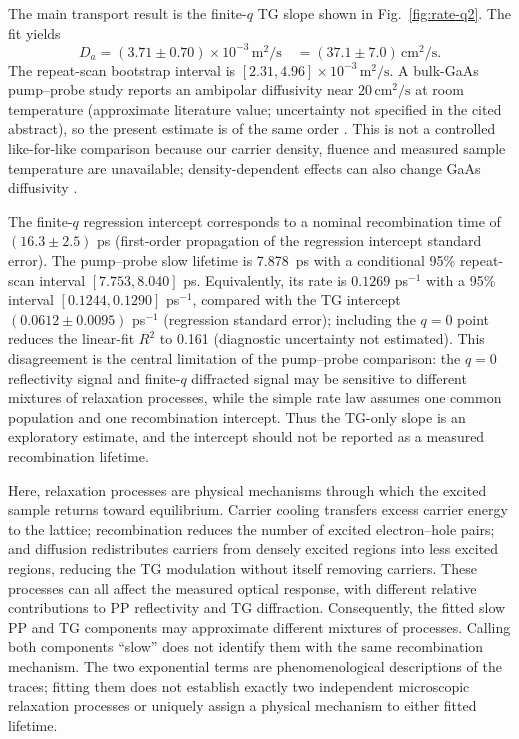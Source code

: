 \documentclass[11pt,a4paper]{article}
\begin{document}
The main transport result is the finite-$q$ TG slope shown in Fig.~\ref{fig:rate-q2}. The fit yields
\begin{equation*}
D_a=(3.71\pm0.70)\times10^{-3}\,\si{\metre\squared\per\second}
\quad = (37.1\pm7.0)\,\si{\centi\metre\squared\per\second}.
\end{equation*}
The repeat-scan bootstrap interval is $[2.31,4.96]\times10^{-3}\,\si{\metre\squared\per\second}$. A bulk-GaAs pump--probe study reports an ambipolar diffusivity near $20\,\si{\centi\metre\squared\per\second}$ at room temperature (approximate literature value; uncertainty not specified in the cited abstract), so the present estimate is of the same order \cite{ruzicka}. This is not a controlled like-for-like comparison because our carrier density, fluence and measured sample temperature are unavailable; density-dependent effects can also change GaAs diffusivity \cite{young}.

The finite-$q$ regression intercept corresponds to a nominal recombination time of $(16.3\pm2.5)$ ps (first-order propagation of the regression intercept standard error). The pump--probe slow lifetime is \SI{7.878}{ps} with a conditional 95\% repeat-scan interval $[7.753,8.040]$ ps. Equivalently, its rate is $0.1269$ ps$^{-1}$ with a 95\% interval $[0.1244,0.1290]$ ps$^{-1}$, compared with the TG intercept $(0.0612\pm0.0095)$ ps$^{-1}$ (regression standard error); including the $q=0$ point reduces the linear-fit $R^2$ to 0.161 (diagnostic uncertainty not estimated). This disagreement is the central limitation of the pump--probe comparison: the $q=0$ reflectivity signal and finite-$q$ diffracted signal may be sensitive to different mixtures of relaxation processes, while the simple rate law assumes one common population and one recombination intercept. Thus the TG-only slope is an exploratory estimate, and the intercept should not be reported as a measured recombination lifetime.

Here, relaxation processes are physical mechanisms through which the excited sample returns toward equilibrium. Carrier cooling transfers excess carrier energy to the lattice; recombination reduces the number of excited electron--hole pairs; and diffusion redistributes carriers from densely excited regions into less excited regions, reducing the TG modulation without itself removing carriers. These processes can all affect the measured optical response, with different relative contributions to PP reflectivity and TG diffraction. Consequently, the fitted slow PP and TG components may approximate different mixtures of processes. Calling both components ``slow'' does not identify them with the same recombination mechanism. The two exponential terms are phenomenological descriptions of the traces; fitting them does not establish exactly two independent microscopic relaxation processes or uniquely assign a physical mechanism to either fitted lifetime.
\end{document}
